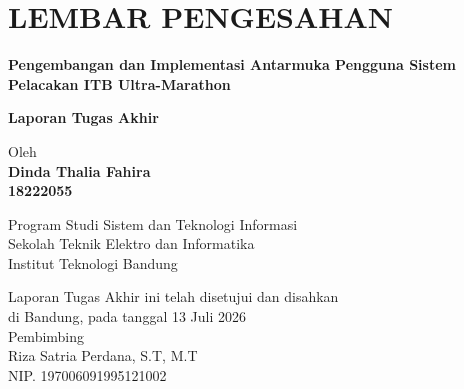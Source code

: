 \chapter*{LEMBAR PENGESAHAN}


\begin{center}
    \vspace{2cm}
  {\large\bfseries Pengembangan dan Implementasi Antarmuka Pengguna Sistem Pelacakan ITB Ultra-Marathon}\\
     \vspace{2cm}

  {\Large \textbf{Laporan Tugas Akhir}}\\


  \vspace{1.5cm}
    
    
  {\large Oleh}\\[0.3cm]
    \textbf{
    {\large Dinda Thalia Fahira}\\
    {\large 18222055}
  }\\
    
  \vspace{0.5cm}
 
  {\large Program Studi Sistem dan Teknologi Informasi}\\
  {\large Sekolah Teknik Elektro dan Informatika}\\
  {\large Institut Teknologi Bandung}\\

  \vspace{1.5cm}

  Laporan Tugas Akhir ini telah disetujui dan disahkan\\ 
  di Bandung, pada tanggal 13 Juli 2026\\[1cm]

	Pembimbing  \\[3cm]
	Riza Satria Perdana, S.T, M.T   \\[0.2cm]
	NIP. 197006091995121002 

\end{center}

\vspace{1cm}
\noindent




